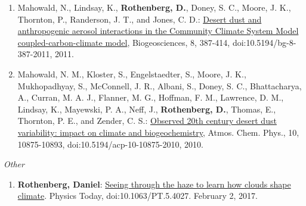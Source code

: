 \documentclass[11pt,letterpaper]{article}
\begin{document}
\begin{enumerate}[itemindent=-10pt]
 \item Mahowald, N., Lindsay, K., \textbf{Rothenberg, D.}, Doney, S. C., Moore, J. K., Thornton, P., Randerson, J. T., and Jones, C. D.: \href{http://dx.doi.org/10.5194/bg-8-387-2011}{Desert dust and anthropogenic aerosol interactions in the Community Climate System Model coupled-carbon-climate model}, Biogeosciences, 8, 387-414, doi:10.5194/bg-8-387-2011, 2011.

 \item Mahowald, N. M., Kloster, S., Engelstaedter, S., Moore, J. K., Mukhopadhyay, S., McConnell, J. R., Albani, S., Doney, S. C., Bhattacharya, A., Curran, M. A. J., Flanner, M. G., Hoffman, F. M., Lawrence, D. M., Lindsay, K., Mayewski, P. A., Neff, J., \textbf{Rothenberg, D.}, Thomas, E., Thornton, P. E., and Zender, C. S.: \href{http://dx.doi.org/10.5194/acp-10-10875-2010}{Observed 20th century desert dust variability: impact on climate and biogeochemistry}, Atmos. Chem. Phys., 10, 10875-10893, doi:10.5194/acp-10-10875-2010, 2010.
\end{enumerate}

\bigskip
\emph{Other}
\medskip
\begin{enumerate}[itemindent=-10pt]

\item \textbf{Rothenberg, Daniel}: \href{http://physicstoday.scitation.org/do/10.1063/PT.5.4027/full/}{Seeing through the haze to learn how clouds shape climate}. Physics Today, doi:10.1063/PT.5.4027. February 2, 2017.

\end{enumerate}
\end{document}
